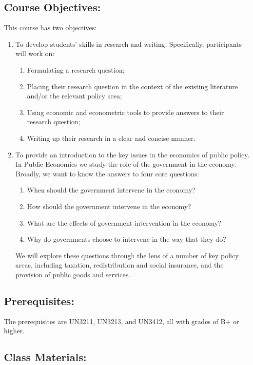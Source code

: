 \documentclass[11pt]{article}
\begin{document}
\subsection*{Course Objectives:}
This course has two objectives:

\begin{enumerate}
    \item To develop students' skills in research and writing. Specifically, participants will work on:
    \begin{enumerate}
        \item Formulating a research question;
        \item Placing their research question in the context of the existing literature and/or the relevant policy area;
        \item Using economic and econometric tools to provide answers to their research question;
        \item Writing up their research in a clear and concise manner.
    \end{enumerate}
    \item To provide an introduction to the key issues in the economics of public policy. In Public Economics we study the role of the government in the economy. Broadly, we want to know the answers to four core questions:
    \begin{enumerate}
        \item When should the government intervene in the economy?
        \item How should the government intervene in the economy?
        \item What are the effects of government intervention in the economy?
        \item Why do governments choose to intervene in the way that they do?
    \end{enumerate}
    We will explore these questions through the lens of a number of key policy areas, including taxation, redistribution and social insurance, and the provision of public goods and services.
\end{enumerate}

\subsection*{Prerequisites:}
The prerequisites are UN3211, UN3213, and UN3412, all with grades of B+ or higher.

\subsection*{Class Materials:}
\end{document}
